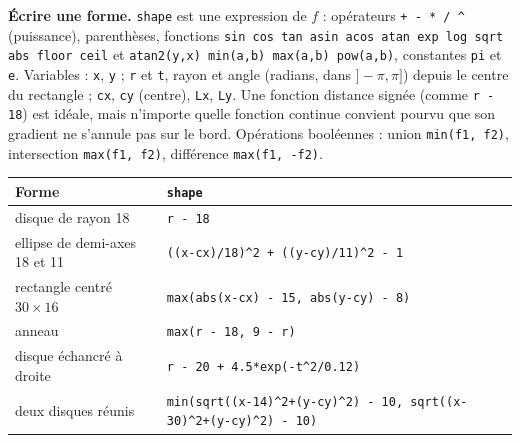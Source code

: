 \documentclass[10pt,a4paper]{article}
\newcommand{\code}[1]{\texttt{#1}}
\begin{document}
\textbf{Écrire une forme.} \code{shape} est une expression de $f$ : opérateurs \code{+ - * / \textasciicircum}
(puissance), parenthèses, fonctions \code{sin cos tan asin acos atan exp log sqrt abs floor ceil} et
\code{atan2(y,x) min(a,b) max(a,b) pow(a,b)}, constantes \code{pi} et \code{e}. Variables : \code{x}, \code{y} ;
\code{r} et \code{t}, rayon et angle (radians, dans $]-\pi,\pi]$) depuis le centre du rectangle ; \code{cx},
\code{cy} (centre), \code{Lx}, \code{Ly}. Une fonction distance signée (comme \code{r - 18}) est idéale, mais
n'importe quelle fonction continue convient pourvu que son gradient ne s'annule pas sur le bord. Opérations
booléennes : union \code{min(f1, f2)}, intersection \code{max(f1, f2)}, différence \code{max(f1, -f2)}.

\begin{center}
\begin{tabular}{@{}ll@{}}
  \toprule
  Forme & \code{shape} \\
  \midrule
  disque de rayon 18 & \code{r - 18} \\
  ellipse de demi-axes 18 et 11 & \code{((x-cx)/18)\textasciicircum2 + ((y-cy)/11)\textasciicircum2 - 1} \\
  rectangle centré $30\times16$ & \code{max(abs(x-cx) - 15, abs(y-cy) - 8)} \\
  anneau & \code{max(r - 18, 9 - r)} \\
  disque échancré à droite & \code{r - 20 + 4.5*exp(-t\textasciicircum2/0.12)} \\
  deux disques réunis & \code{min(sqrt((x-14)\textasciicircum2+(y-cy)\textasciicircum2) - 10, sqrt((x-30)\textasciicircum2+(y-cy)\textasciicircum2) - 10)} \\
  \bottomrule
\end{tabular}
\end{center}
\end{document}
